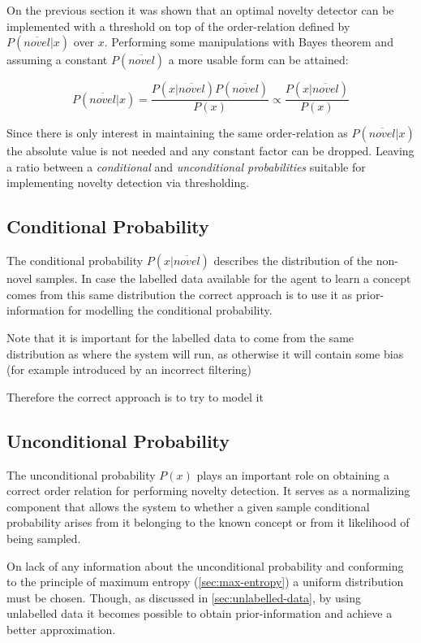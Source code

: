 On the previous section it was shown that an optimal novelty detector can be
implemented with a threshold on top of the order-relation defined by
$P(\overline{novel}|x)$ over $x$. Performing some manipulations with
Bayes theorem and assuming a constant $P(\overline{novel})$ a more usable
form can be attained:

\begin{equation}
\label{eq:novelty-ratio}
          P(\overline{novel}|x)
  =       \frac{P(x|\overline{novel}) P(\overline{novel})}{P(x)}
  \propto \frac{P(x|\overline{novel})}{P(x)}
\end{equation}

Since there is only interest in maintaining the same order-relation as
$P(\overline{novel}|x)$ the absolute value is not needed and any constant
factor can be dropped. Leaving a ratio between a \emph{conditional} and
\emph{unconditional probabilities} suitable for implementing novelty detection
via  thresholding.



\subsection{Conditional Probability}
The conditional probability $P(x|\overline{novel})$ describes the distribution
of the non-novel samples. In case the labelled data available for the agent
to learn a concept comes from this same distribution the correct approach
is to use it as prior-information for modelling the conditional probability.

Note that it is important for the labelled data to come from the same
distribution as where the system will run, as otherwise it will contain some
bias (for example introduced by an incorrect filtering)

Therefore the correct approach is to try to model it 


\subsection{Unconditional Probability}
The unconditional probability $P(x)$ plays an important role on obtaining a
correct order relation for performing novelty detection.
It serves as a normalizing component that allows the system to  whether
a given sample conditional probability arises from it belonging to the
known concept or from it likelihood of being sampled.


On lack of any information about the unconditional probability and conforming to
the principle of maximum entropy (\autoref{sec:max-entropy}) a uniform
distribution must be chosen.
Though, as discussed in \autoref{sec:unlabelled-data}, by using unlabelled data
it becomes possible to obtain prior-information and achieve a better
approximation.



